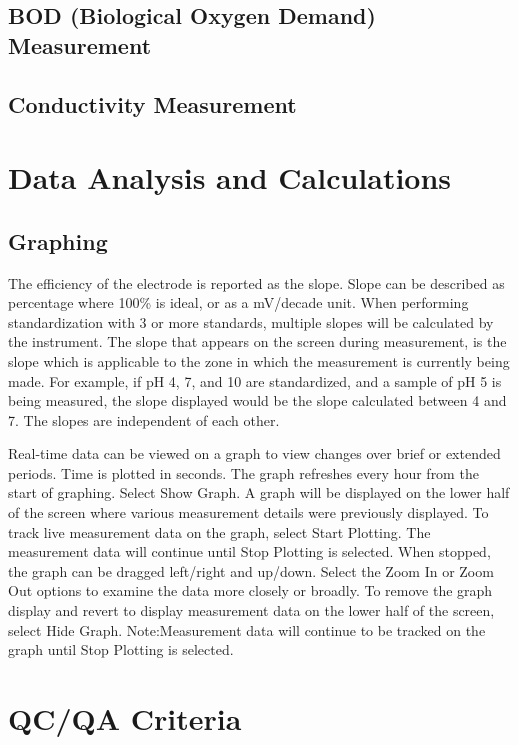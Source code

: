 \documentclass[12pt]{../SOP3_beta}\usepackage[]{graphicx}\usepackage[]{color}
\begin{document}
\subsection{BOD (Biological Oxygen Demand) Measurement}

\subsection{Conductivity Measurement}


\section{Data Analysis and Calculations}

\subsection{Graphing}
\NP The efficiency of the electrode is reported as the slope. Slope can be described as percentage where 100\% is ideal, or as a mV/decade unit. When performing  standardization with 3 or more standards, multiple slopes will be calculated by the  instrument. The slope that appears on the screen during measurement, is the slope which is applicable to the zone in which the measurement is currently being made. For example, if pH 4, 7, and 10 are standardized, and a sample of pH 5 is being measured, the slope displayed would be the slope calculated between 4 and 7. The slopes are independent of each other. 

\NP Real-time data can be viewed on a graph to view changes over brief or  extended  periods. Time  is  plotted  in  seconds. The  graph  refreshes  every  hour  from  the  start of graphing.
\NP Select Show Graph. A graph will be displayed on the lower half of the screen where various measurement details were previously displayed.  
\NP To track live measurement data on the graph, select 
Start Plotting. The measurement data will continue until 
Stop Plotting is selected. When stopped, the graph can be dragged left/right and up/down.
\NP Select the Zoom In or Zoom Out options to examine the data more closely or broadly.
\NP To remove the graph display and revert to display measurement data on the lower half of the screen, select Hide Graph. Note:Measurement  data  will  continue  to  be  tracked  on  the  graph  until  Stop  Plotting is  selected.  

\section{QC/QA Criteria}
\end{document}
